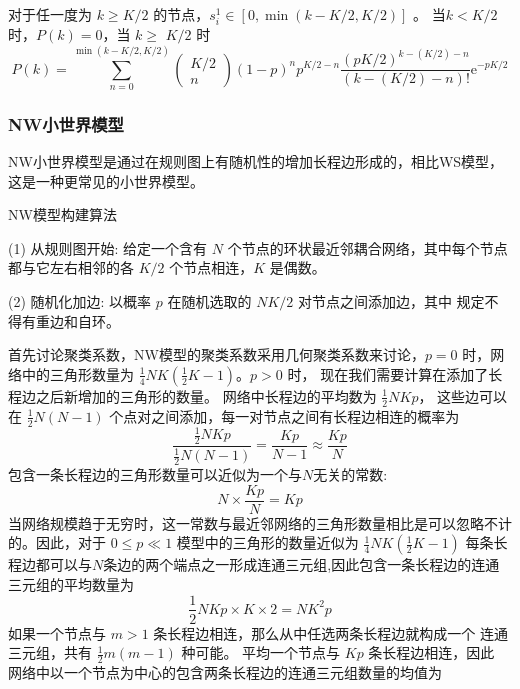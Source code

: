 对于任一度为 $k \geqslant K / 2$ 的节点，$s_i^1 \in[0,\min (k-K / 2,K / 2)]$ 。
当$k<K/2$时，$P(k)=0$，当 $k \geqslant$ $K / 2$ 时
\begin{equation}
    P(k)=\sum_{n=0}^{\min (k-K / 2,K / 2)}\left(\begin{array}{c}
    K / 2 \\
    n
    \end{array}\right)(1-p)^n p^{K / 2-n} \frac{(p K / 2)^{k-(K / 2)-n}}{(k-(K / 2)-n) !} \mathrm{e}^{-p K / 2}
\end{equation}
\subsubsection{NW小世界模型}
NW小世界模型是通过在规则图上有随机性的增加长程边形成的，相比WS模型，这是一种更常见的小世界模型。\par
\noindent NW模型构建算法\par
\noindent(1) 从规则图开始: 给定一个含有 $N$ 个节点的环状最近邻耦合网络，其中每个节点都与它左右相邻的各 $K / 2$ 个节点相连，$K$ 是偶数。\par
\noindent(2) 随机化加边: 以概率 $p$ 在随机选取的 $NK / 2$ 对节点之间添加边，其中 规定不得有重边和自环。\par
首先讨论聚类系数，NW模型的聚类系数采用几何聚类系数来讨论，$p=0$ 时，网络中的三角形数量为 
$\frac{1}{4} N K\left(\frac{1}{2} K-1\right)$。$ p>0$ 时，
现在我们需要计算在添加了长程边之后新增加的三角形的数量。 网络中长程边的平均数为 $\frac{1}{2} N K p$，
这些边可以在 $\frac{1}{2} N(N-1)$ 个点对之间添加，每一对节点之间有长程边相连的概率为
\begin{equation}
    \frac{\frac{1}{2} N K p}{\frac{1}{2} N(N-1)}=\frac{K p}{N-1} \approx \frac{K p}{N}
 \end{equation}
 包含一条长程边的三角形数量可以近似为一个与$N$无关的常数:
 \begin{equation}
    N \times \frac{K p}{N}=K p
\end{equation}
当网络规模趋于无穷时，这一常数与最近邻网络的三角形数量相比是可以忽略不计的。因此，对于 $0 \leqslant p \ll 1$ 
模型中的三角形的数量近似为 $\frac{1}{4} N K\left(\frac{1}{2} K-1\right) $
每条长程边都可以与$N$条边的两个端点之一形成连通三元组,因此包含一条长程边的连通三元组的平均数量为
\begin{equation}
    \frac{1}{2} N K p \times K \times 2=N K^2 p
\end{equation}
如果一个节点与 $m>1$ 条长程边相连，那么从中任选两条长程边就构成一个 连通三元组，共有 $\frac{1}{2} m(m-1)$ 种可能。
平均一个节点与 $K p$ 条长程边相连，因此 网络中以一个节点为中心的包含两条长程边的连通三元组数量的均值为

